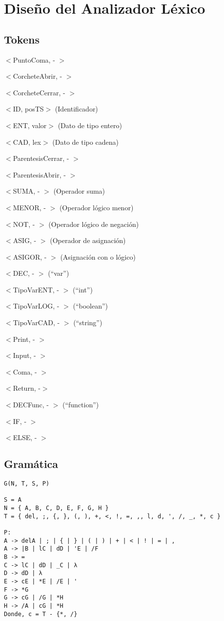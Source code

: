 \section{Diseño del Analizador Léxico}

\subsection{Tokens}
\indent

$<$PuntoComa, - $>$

$<$CorcheteAbrir, - $>$ 

$<$CorcheteCerrar, - $>$

$<$ID, posTS$>$ (Identificador)

$<$ENT, valor$>$ (Dato de tipo entero)

$<$CAD, lex$>$ (Dato de tipo cadena)

$<$ParentesisCerrar, - $>$

$<$ParentesisAbrir, - $>$

$<$SUMA, - $>$ (Operador suma)

$<$MENOR, - $>$ (Operador lógico menor)

$<$NOT, - $>$ (Operador lógico de negación)

$<$ASIG, - $>$ (Operador de asignación)

$<$ASIGOR, - $>$ (Asignación con o lógico)

$<$DEC, - $>$ (“var”)

$<$TipoVarENT, - $>$ (“int”)

$<$TipoVarLOG, - $>$ (“boolean”)

$<$TipoVarCAD, - $>$ (“string”)

$<$Print, - $>$

$<$Input, - $>$

$<$Coma, - $>$

$<$Return, -$>$

$<$DECFunc, - $>$ (“function”)

$<$IF, - $>$

$<$ELSE, - $>$
\subsection{Gramática}

\begin{lstlisting}[style = Gramatica]
G(N, T, S, P)

S = A
N = { A, B, C, D, E, F, G, H }
T = { del, ;, {, }, (, ), +, <, !, =, ,, l, d, ', /, _, *, c }   

P:
A -> delA | ; | { | } | ( | ) | + | < | ! | = | ,
A -> |B | lC | dD | 'E | /F
B -> =
C -> lC | dD | _C | λ
D -> dD | λ
E -> cE | *E | /E | '
F -> *G
G -> cG | /G | *H
H -> /A | cG | *H
Donde, c = T - {*, /}
\end{lstlisting}

